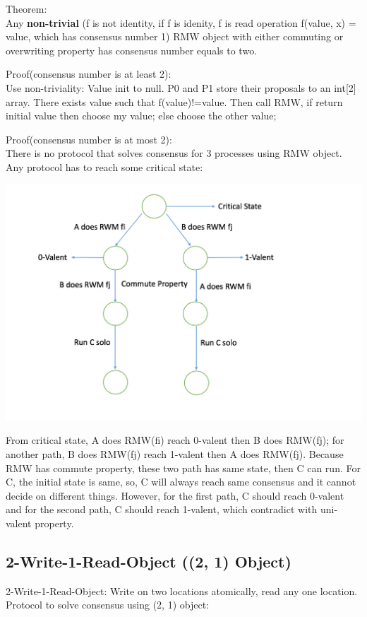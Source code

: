\documentclass[twoside]{article}
\begin{document}
	Theorem:\\
	Any \textbf{non-trivial} (f is not identity, if f is idenity, f is read operation f(value, x) = value, which has consensus number 1) RMW object with either commuting or overwriting property has consensus number equals to two.
	
	Proof(consensus number is at least 2):\\
	Use non-triviality: Value init to null. P0 and P1 store their proposals to an int[2] array.  There exists value such that f(value)!=value. Then call RMW, if return initial value then choose my value; else choose the other value;
	
	Proof(consensus number is at most 2):\\
	There is no protocol that solves consensus for 3 processes using RMW object. Any protocol has to reach some critical state:
	
	\begin{center}
		\includegraphics[scale=0.7]{upload.png}
	\end{center}
	
	From critical state, A does RMW(fi) reach 0-valent then B does RMW(fj); for another path, B does RMW(fj) reach 1-valent then A does RMW(fj). Because RMW has commute property, these two path has same state, then C can run. For C, the initial state is same, so, C will always reach same consensus and it cannot decide on different things. However, for the first path, C should reach 0-valent and for the second path, C should reach 1-valent, which contradict with uni-valent property.
	
	
	\subsection{2-Write-1-Read-Object ((2, 1) Object)}
	2-Write-1-Read-Object: Write on two locations atomically, read any one location.\\
	Protocol to solve consensus using (2, 1) object:\\
	
\end{document}
